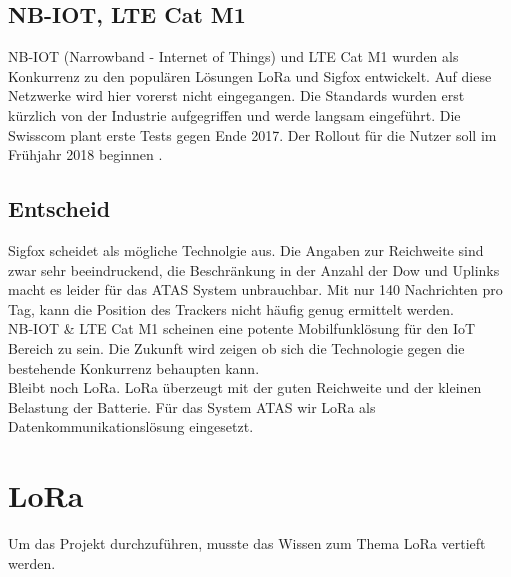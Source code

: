 \documentclass[11pt,english,german]{report}
\theoremstyle{definition}
\begin{document}
\newpage
\subsection{NB-IOT, LTE Cat M1}
NB-IOT (Narrowband - Internet of Things) und LTE Cat M1 wurden als Konkurrenz zu den populären Lösungen LoRa und Sigfox entwickelt. Auf diese Netzwerke wird hier vorerst nicht eingegangen. Die Standards wurden erst kürzlich von der Industrie aufgegriffen und werde langsam eingeführt. Die Swisscom plant erste Tests gegen Ende 2017. Der Rollout für die Nutzer soll im Frühjahr 2018 beginnen \cite{swisscomnbiot}.

\subsection{Entscheid}
Sigfox scheidet als mögliche Technolgie aus. Die Angaben zur Reichweite sind zwar sehr beeindruckend, die Beschränkung in der Anzahl der Dow und Uplinks macht es leider für das ATAS System unbrauchbar. Mit nur 140 Nachrichten pro Tag, kann die Position des Trackers nicht häufig genug ermittelt werden.\\[0.3cm]
NB-IOT \& LTE Cat M1 scheinen eine potente Mobilfunklösung für den IoT Bereich zu sein. Die Zukunft wird zeigen ob sich die Technologie gegen die bestehende Konkurrenz behaupten kann.\\[0.3cm]
Bleibt noch LoRa. LoRa überzeugt mit der guten Reichweite und der kleinen Belastung der Batterie. Für das System ATAS wir LoRa als Datenkommunikationslösung eingesetzt.

\newpage
\section{LoRa}
Um das Projekt durchzuführen, musste das Wissen zum Thema LoRa vertieft werden.
\end{document}
